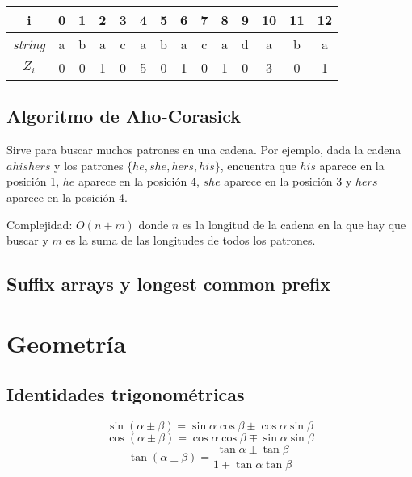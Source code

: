 \documentclass[10pt,letterpaper,twocolumn]{article}
\newcommand{\codigofuente}[1]{

\dotfill
}
\begin{document}
\begin{center}
  \begin{tabular}{| c | c c c c c c c c c c c c c | }
    \hline
    i & 0 & 1 & 2 & 3 & 4 & 5 & 6 & 7 & 8 & 9 & 10 & 11 & 12 \\ [0.5ex]
    \hline
    \hline
    \textit{string} & a & b & a & c & a & b & a & c & a & d & a & b & a \\
    \textit{$Z_i$} & 0 & 0 & 1 & 0 & 5 & 0 & 1 & 0 & 1 & 0 & 3 & 0 & 1 \\
    \hline
  \end{tabular}
\end{center}


\codigofuente{./src/strings/z_algorithm.cpp}

\subsection{Algoritmo de Aho-Corasick}
Sirve para buscar muchos patrones en una cadena. Por ejemplo,
dada la cadena $ahishers$ y los patrones $\{he, she, hers, his\}$,
encuentra que $his$ aparece en la posición 1, $he$ aparece en la posición 4,
$she$ aparece en la posición 3 y $hers$ aparece en la posición 4.

\smallskip

Complejidad: $O(n + m)$ donde $n$ es la longitud de la cadena en la que hay que buscar
y $m$ es la suma de las longitudes de todos los patrones.

\smallskip

\codigofuente{./src/strings/aho-corasick.cpp}
\subsection{Suffix arrays y longest common prefix}
\codigofuente{./src/strings/suffix_arrays.cpp}

\section{Geometría}

\subsection{Identidades trigonométricas}

$$ \sin(\alpha \pm \beta) = \sin \alpha \cos \beta \pm \cos \alpha \sin \beta $$
$$ \cos(\alpha \pm \beta) = \cos \alpha \cos \beta \mp \sin \alpha \sin \beta $$
$$ \tan(\alpha \pm \beta) = \frac{\tan \alpha \pm \tan \beta}{1 \mp \tan \alpha \tan \beta} $$
\end{document}
